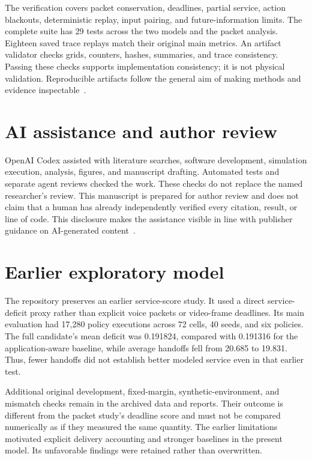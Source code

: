 \documentclass[11pt,a4paper]{article}
\begin{document}
The verification covers packet conservation, deadlines, partial service, action blackouts, deterministic replay, input pairing, and future-information limits. The complete suite has 29 tests across the two models and the packet analysis. Eighteen saved trace replays match their original main metrics. An artifact validator checks grids, counters, hashes, summaries, and trace consistency. Passing these checks supports implementation consistency; it is not physical validation. Reproducible artifacts follow the general aim of making methods and evidence inspectable~\cite{P06}.

\section*{AI assistance and author review}
OpenAI Codex assisted with literature searches, software development, simulation execution, analysis, figures, and manuscript drafting. Automated tests and separate agent reviews checked the work. These checks do not replace the named researcher's review. This manuscript is prepared for author review and does not claim that a human has already independently verified every citation, result, or line of code. This disclosure makes the assistance visible in line with publisher guidance on AI-generated content~\cite{P07}.

\appendix
\section{Earlier exploratory model}
The repository preserves an earlier service-score study. It used a direct service-deficit proxy rather than explicit voice packets or video-frame deadlines. Its main evaluation had 17,280 policy executions across 72 cells, 40 seeds, and six policies. The full candidate's mean deficit was 0.191824, compared with 0.191316 for the application-aware baseline, while average handoffs fell from 20.685 to 19.831. Thus, fewer handoffs did not establish better modeled service even in that earlier test.

Additional original development, fixed-margin, synthetic-environment, and mismatch checks remain in the archived data and reports. Their outcome is different from the packet study's deadline score and must not be compared numerically as if they measured the same quantity. The earlier limitations motivated explicit delivery accounting and stronger baselines in the present model. Its unfavorable findings were retained rather than overwritten.
\end{document}
